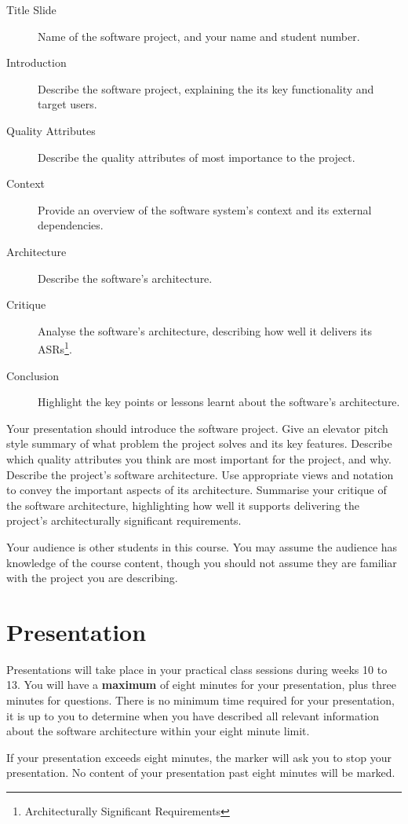 \documentclass{csse4400}
\begin{document}
\begin{description}
    \item[Title Slide] Name of the software project, and your name and student number.
    \item[Introduction] Describe the software project, explaining the its key functionality and target users.
    \item[Quality Attributes] Describe the quality attributes of most importance to the project.
    \item[Context] Provide an overview of the software system's context and its external dependencies.
    \item[Architecture] Describe the software's architecture.
    \item[Critique] Analyse the software's architecture, describing how well it delivers its ASRs\footnote{Architecturally Significant Requirements}.
    \item[Conclusion] Highlight the key points or lessons learnt about the software's architecture.
\end{description}

Your presentation should introduce the software project.
Give an elevator pitch style summary of what problem the project solves and its key features.
Describe which quality attributes you think are most important for the project, and why.
Describe the project's software architecture. Use appropriate views and notation to convey the important aspects of its architecture.
Summarise your critique of the software architecture, highlighting how well it supports delivering the project's architecturally significant requirements.

Your audience is other students in this course. You may assume the audience has knowledge of the course content,
though you should not assume they are familiar with the project you are describing.


\section{Presentation}
Presentations will take place in your practical class sessions during weeks 10 to 13.
You will have a \textbf{maximum} of eight minutes for your presentation, plus three minutes for questions.
There is no minimum time required for your presentation,
it is up to you to determine when you have described all relevant information about the software architecture within your eight minute limit.

If your presentation exceeds eight minutes, the marker will ask you to stop your presentation.
No content of your presentation past eight minutes will be marked.
\end{document}
